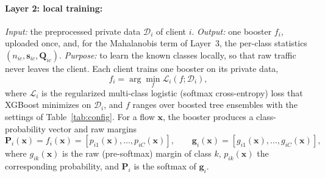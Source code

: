 \documentclass[pdflatex,sn-mathphys-num]{sn-jnl}
\begin{document}
{{\paragraph{Layer 2: local training:} \emph{Input:} the preprocessed private data $\mathcal{D}_i$ of client $i$. \emph{Output:} one booster $f_i$, uploaded once, and, for the Mahalanobis term of Layer~3, the per-class statistics $(n_{ic},\mathbf{s}_{ic},\mathbf{Q}_{ic})$. \emph{Purpose:} to learn the known classes locally, so that raw traffic never leaves the client. Each client trains one booster on its private data,
\begin{equation}
f_i=\arg\min_{f}\mathcal{L}_i(f;\mathcal{D}_i),\label{eq:local}
\end{equation}
where $\mathcal{L}_i$ is the regularized multi-class logistic (softmax cross-entropy) loss that XGBoost minimizes on $\mathcal{D}_i$, and $f$ ranges over boosted tree ensembles with the settings of Table~\ref{tab:config}. For a flow $\mathbf{x}$, the booster produces a class-probability vector and raw margins
\begin{equation}
\mathbf{P}_i(\mathbf{x})=f_i(\mathbf{x})=[p_{i1}(\mathbf{x}),\dots,p_{iC}(\mathbf{x})],\qquad \mathbf{g}_i(\mathbf{x})=[g_{i1}(\mathbf{x}),\dots,g_{iC}(\mathbf{x})],\label{eq:prob}
\end{equation}
where $g_{ik}(\mathbf{x})$ is the raw (pre-softmax) margin of class $k$, $p_{ik}(\mathbf{x})$ the corresponding probability, and $\mathbf{P}_i$ is the softmax of $\mathbf{g}_i$.}

{\color{black}
}}
\end{document}
